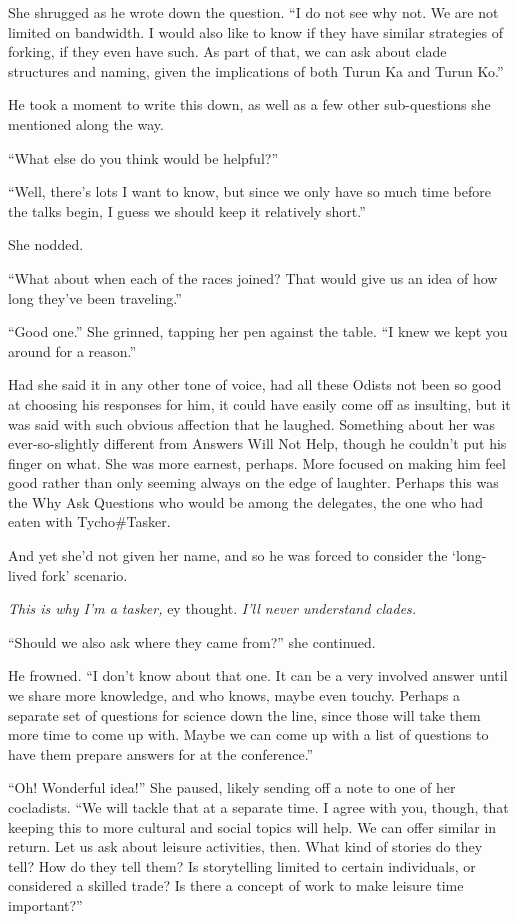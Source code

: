 She shrugged as he wrote down the question. ``I do not see why not. We are not limited on bandwidth. I would also like to know if they have similar strategies of forking, if they even have such. As part of that, we can ask about clade structures and naming, given the implications of both Turun Ka and Turun Ko.''

He took a moment to write this down, as well as a few other sub-questions she mentioned along the way.

``What else do you think would be helpful?''

``Well, there's lots I want to know, but since we only have so much time before the talks begin, I guess we should keep it relatively short.''

She nodded.

``What about when each of the races joined? That would give us an idea of how long they've been traveling.''

``Good one.'' She grinned, tapping her pen against the table. ``I knew we kept you around for a reason.''

Had she said it in any other tone of voice, had all these Odists not been so good at choosing his responses for him, it could have easily come off as insulting, but it was said with such obvious affection that he laughed. Something about her was ever-so-slightly different from Answers Will Not Help, though he couldn't put his finger on what. She was more earnest, perhaps. More focused on making him feel good rather than only seeming always on the edge of laughter. Perhaps this was the Why Ask Questions who would be among the delegates, the one who had eaten with Tycho\#Tasker.

And yet she'd not given her name, and so he was forced to consider the `long-lived fork' scenario.

\emph{This is why I'm a tasker,} ey thought. \emph{I'll never understand clades.}

``Should we also ask where they came from?'' she continued.

He frowned. ``I don't know about that one. It can be a very involved answer until we share more knowledge, and who knows, maybe even touchy. Perhaps a separate set of questions for science down the line, since those will take them more time to come up with. Maybe we can come up with a list of questions to have them prepare answers for at the conference.''

``Oh! Wonderful idea!'' She paused, likely sending off a note to one of her cocladists. ``We will tackle that at a separate time. I agree with you, though, that keeping this to more cultural and social topics will help. We can offer similar in return. Let us ask about leisure activities, then. What kind of stories do they tell? How do they tell them? Is storytelling limited to certain individuals, or considered a skilled trade? Is there a concept of work to make leisure time important?''

